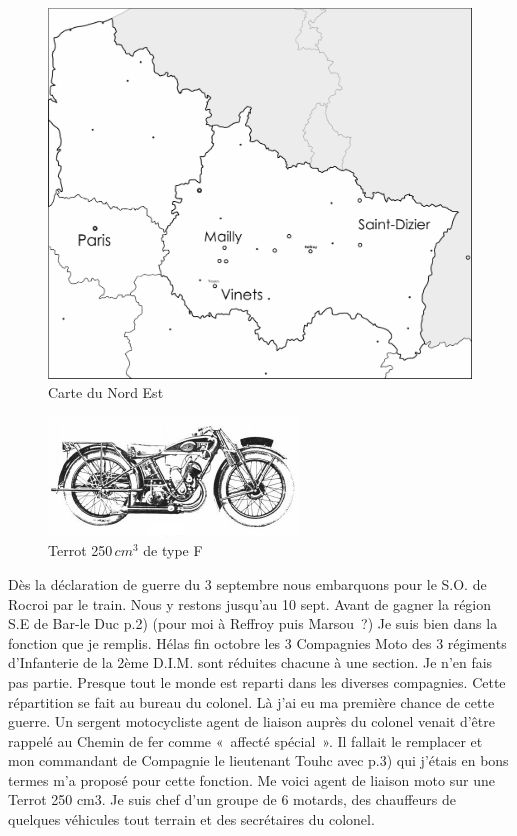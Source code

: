 \documentclass[a5paper,pagesize,10pt,bibtotoc,pointlessnumbers,
normalheadings,DIV=9,twoside=false]{scrbook}
\begin{document}
	\begin{figure}[]
		\centering
		\includegraphics[scale=0.4]{./imgs/carte2.pdf}
		\caption{Carte du Nord Est}
		\label{histo_Mt}
	\end{figure}

	\begin{figure}[]
	\centering
	\includegraphics[scale=2]{./imgs/Terrot250.pdf}
	\caption{Terrot 250\,$cm^3$ de type F}
	\label{histo_Mt}
\end{figure}
	
	Dès la déclaration de guerre du 3 septembre nous embarquons pour le S.O. de Rocroi par le train. Nous y restons jusqu’au 10 sept. Avant de gagner la région S.E de Bar-le Duc p.2) (pour moi à Reffroy puis Marsou ?)
	Je suis bien dans la fonction que je remplis.
	Hélas fin octobre les 3 Compagnies Moto des 3 régiments d’Infanterie de la 2ème D.I.M. sont réduites chacune à une section. Je n’en fais pas partie. Presque tout le monde est reparti dans les diverses compagnies. Cette répartition se fait au bureau du colonel. Là j’ai eu ma première chance de cette guerre. Un sergent motocycliste agent de liaison auprès du colonel venait d’être rappelé au Chemin de fer comme « affecté spécial ». Il fallait le remplacer et mon commandant de Compagnie le lieutenant Touhc avec p.3) qui j’étais en bons termes m’a proposé pour cette fonction. Me voici agent de liaison moto sur une Terrot 250 cm3. Je suis chef d’un groupe de 6 motards, des chauffeurs de quelques véhicules tout terrain et des secrétaires du colonel.
	
\end{document}
